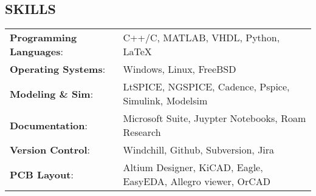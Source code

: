 \documentclass[line,margin]{res}
\begin{document}
\begin{resume}
	\section{SKILLS}
	\begin{tabular}{@{}ll}
		\textbf{Programming Languages}: & C++/C, MATLAB, VHDL, Python, LaTeX                            \\
		\textbf{Operating Systems}:     & Windows, Linux, FreeBSD                                       \\
		\textbf{Modeling \& Sim}:       & LtSPICE, NGSPICE, Cadence, Pspice, Simulink, Modelsim         \\
		\textbf{Documentation}:         & Microsoft Suite, Juypter Notebooks, Roam Research             \\
		\textbf{Version Control}:       & Windchill, Github, Subversion, Jira                           \\
		\textbf{PCB Layout}:            & Altium Designer, KiCAD, Eagle, EasyEDA, Allegro viewer, OrCAD \\
	\end{tabular}

\end{resume}
\end{document}
